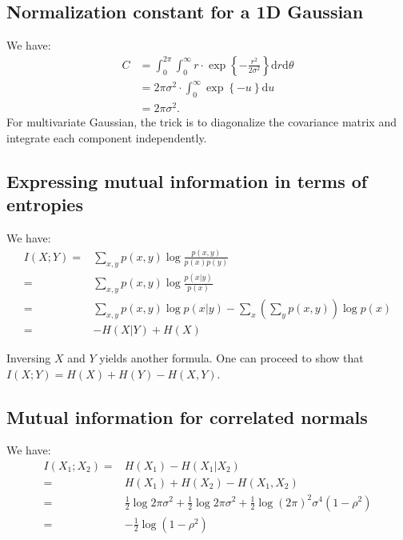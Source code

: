 \documentclass[UTF8]{ctexart}
\begin{document}
\subsection{Normalization constant for a 1D Gaussian}
We have:
$$
\begin{aligned}
C&=\int_{0}^{2\pi}\int_{0}^{\infty}r\cdot\exp\left\{-\frac{r^{2}}{2\sigma^{2}} \right\}\text{d}r\text{d}\theta\\
&=2\pi\sigma^{2}\cdot\int_{0}^{\infty}\exp\left\{-u\right\}\text{d}u\\
&=2\pi\sigma^{2}.
\end{aligned}
$$
For multivariate Gaussian, the trick is to diagonalize the covariance matrix and integrate each component independently.


\subsection{Expressing mutual information in terms of entropies}
We have:
\begin{align}
I(X;Y)=&\sum_{x,y}p(x,y) \log \frac{p(x,y)}{p(x)p(y)} \nonumber \\
=&\sum_{x,y}p(x,y)\log \frac{p(x|y)}{p(x)} \nonumber \\
=&\sum_{x,y}p(x,y)\log p(x|y) - \sum_{x}(\sum_{y}p(x,y))\log p(x) \nonumber \\
=&-H(X|Y)+H(X) \nonumber
\end{align}

Inversing $X$ and $Y$ yields another formula.
One can proceed to show that $I(X;Y)=H(X)+H(Y)-H(X,Y)$.

\subsection{Mutual information for correlated normals}
We have:
\begin{align}
I(X_{1};X_{2})=&H(X_{1})-H(X_{1}|X_{2}) \nonumber \\
=&H(X_{1})+H(X_{2})-H(X_{1},X_{2}) \nonumber \\
=&\frac{1}{2}\log 2\pi\sigma^{2}+\frac{1}{2}\log 2\pi\sigma^{2}+\frac{1}{2}\log (2\pi)^{2}\sigma^{4}(1-\rho^{2}) \nonumber \\
=&-\frac{1}{2}\log (1-\rho^{2}) \nonumber
\end{align}
\end{document}
